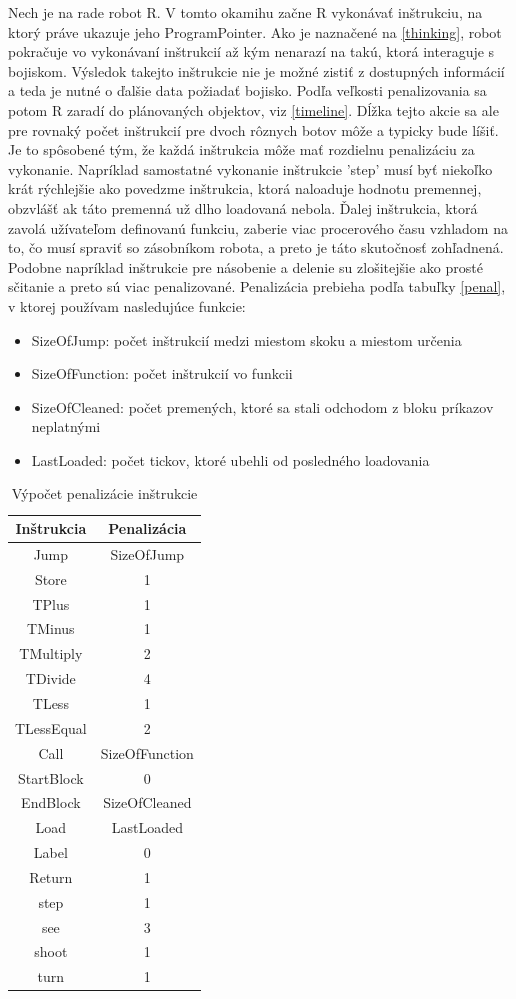 Nech je na rade robot R. V tomto okamihu začne R vykonávať inštrukciu, na ktorý práve ukazuje jeho ProgramPointer. Ako je naznačené na \ref{thinking}, robot pokračuje vo vykonávaní inštrukcií až kým nenarazí na takú, ktorá interaguje s bojiskom. Výsledok takejto inštrukcie nie je možné zistiť z dostupných informácií a teda je nutné o ďalšie data požiadať bojisko. Podľa veľkosti penalizovania sa potom R zaradí do plánovaných objektov, viz \ref{timeline}. Dĺžka tejto akcie sa ale pre rovnaký počet inštrukcií pre dvoch rôznych botov môže a typicky bude líšiť. Je to spôsobené tým, že každá inštrukcia môže mať rozdielnu penalizáciu za vykonanie. Napríklad samostatné vykonanie inštrukcie 'step' musí byť niekoľko krát rýchlejšie ako povedzme inštrukcia, ktorá naloaduje hodnotu premennej, obzvlášť ak táto premenná už dlho loadovaná nebola. Ďalej inštrukcia, ktorá zavolá užívateľom definovanú funkciu, zaberie viac procerového času vzhladom na to, čo musí spraviť so zásobníkom robota, a preto je táto skutočnosť zohľadnená. Podobne napríklad inštrukcie pre násobenie a delenie su zlošitejšie ako prosté sčitanie a preto sú viac penalizované. Penalizácia prebieha podľa tabuľky \ref{penal}, v ktorej používam nasledujúce funkcie:
\begin{itemize}
\item SizeOfJump: počet inštrukcií medzi miestom skoku a miestom určenia
\item SizeOfFunction: počet inštrukcií vo funkcii
\item SizeOfCleaned: počet premených, ktoré sa stali odchodom z bloku príkazov neplatnými
\item LastLoaded: počet tickov, ktoré ubehli od posledného loadovania
\end{itemize}

\begin{table}[ht]
\centering
\caption{Výpočet penalizácie inštrukcie}
\begin{tabular}{c | c }
\hline
Inštrukcia & Penalizácia \\
\hline
Jump & SizeOfJump\\
Store & 1 \\
TPlus & 1 \\
TMinus & 1 \\
TMultiply & 2 \\
TDivide & 4 \\
TLess & 1 \\
TLessEqual & 2 \\ %
Call &  SizeOfFunction \\
StartBlock & 0 \\ %
EndBlock &  SizeOfCleaned \\
Load & LastLoaded \\
Label & 0 \\
Return & 1 \\
\hline
step & 1\\
see & 3\\
shoot & 1\\
turn & 1\\ 
\end {tabular}
\label{table:penal}
\end{table}

